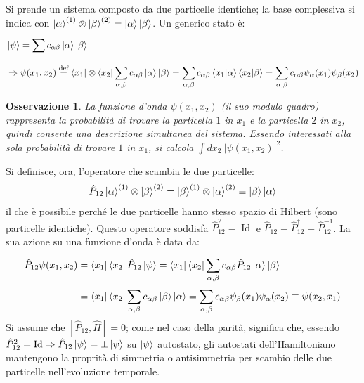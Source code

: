 \documentclass[11pt, a4paper]{scrartcl} %
\numberwithin{equation}{subsection}
\theoremstyle{style2}
\newtheorem{osservazione}{Osservazione}[section]
\theoremstyle{style1}
\begin{document}
Si prende un sistema composto da due particelle identiche; 
la base complessiva si indica con $\ket{\alpha }^{(1)}  \otimes \ket{\beta }^{(2)}  =\ket{\alpha } \ket{\beta } $.
Un generico stato \`e:
\[
	\begin{split}
		&\ket{\psi } = \sum_{}^{} c_{\alpha \beta } \ket{\alpha } \ket{\beta } \\
		&\Rightarrow \psi (x_1,x_2) \overset{\text{def}}{=} \bra{x_1} \otimes \bra{x_2} \sum_{\alpha ,\beta }^{} c_{\alpha \beta } \ket{\alpha } \ket{\beta } = \sum_{\alpha ,\beta }^{} c_{\alpha  \beta } \braket{x_1|\alpha } \braket{x_2|\beta } = \sum_{\alpha ,\beta }^{} c_{\alpha \beta } \psi _\alpha (x_1) \psi _\beta (x_2)
	\end{split}
\] 
\begin{osservazione}
La funzione d'onda $\psi (x_1,x_2)$ (il suo modulo quadro) rappresenta la probabilit\`a di trovare la particella $1 $ in $x_1$ e la particella $2$ in $x_2$, quindi consente una descrizione simultanea del sistema.
Essendo interessati alla sola probabilit\`a di trovare $1$ in $x_1$, si calcola $\int dx_2 \ \lvert \psi (x_1,x_2) \rvert ^2$.
\end{osservazione}
Si definisce, ora, l'operatore che scambia le due particelle:
\begin{equation}
	\hat{P}_{12} \ket{\alpha } ^{(1)} \otimes \ket{\beta } ^{(2)}  = \ket{\beta } ^{(1)}\otimes \ket{\alpha } ^{(2)} \equiv \ket{\beta } \ket{\alpha } 
\end{equation}
il che \`e possibile perch\'e le due particelle hanno stesso spazio di Hilbert (sono particelle identiche).
Questo operatore soddisfa $\hat{P}_{12} ^{2 }  = \operatorname{Id} $ e $\hat{P}_{12} = \hat{P}^\dagger _{12} = \hat{P}^{-1} _{12} $.
La sua azione su una funzione d'onda \`e data da:
\[
	\begin{split}
		\hat{P}_{12}  \psi (x_1,x_2) &= \bra{x_1} \bra{x_2} \hat{P}_{12} \ket{\psi } = \bra{x_1} \bra{x_2} \sum_{\alpha ,\beta }^{} c_{\alpha  \beta } \hat{P}_{12} \ket{\alpha } \ket{\beta } \\
					     &= \bra{x_1} \bra{x_2} \sum_{\alpha ,\beta }^{} c_{\alpha \beta } \ket{\beta } \ket{\alpha } = \sum_{\alpha ,\beta }^{} c_{\alpha \beta } \psi _\beta (x_1) \psi _\alpha (x_2) \equiv\psi (x_2,x_1)
	\end{split}
\] 
Si assume che $[\hat{P}_{12} , \hat{H}] = 0$; come nel caso della parit\`a, significa che, essendo $\hat{P}_{12} ^2 = \operatorname{Id} \Rightarrow \hat{P}_{12} \ket{\psi } = \pm\ket{\psi } $ su $\ket{\psi }$ autostato, gli autostati dell'Hamiltoniano mantengono la proprit\`a di simmetria o antisimmetria per scambio delle due particelle nell'evoluzione temporale.
\end{document}
